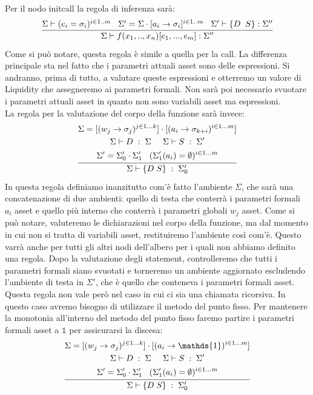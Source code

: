 \documentclass[12pt, a4paper]{report}
\begin{document}
Per il nodo initcall la regola di inferenza sarà:
\[
\infer{\Sigma \vdash f(x_1,..,x_n)[e_1,...,e_m] : \Sigma''}
{\Sigma \vdash (e_i = \sigma_i)^{i\in 1..m}\;\;\; \Sigma'=\Sigma \cdot [a_i \rightarrow \sigma_i]^{i\in 1..m}\;\;\; \Sigma' \vdash \{D\;\; S\} : \Sigma''}    
\]
Come si può notare, questa regola è simile a quella per la call. La differenza principale sta nel fatto che i parametri attuali asset sono delle espressioni. Si andranno, prima di tutto, a valutare queste espressioni e otterremo un valore di Liquidity che assegneremo ai parametri formali. Non sarà poi necessario svuotare i parametri attuali asset in quanto non sono variabili asset ma espressioni.\\
La regola per la valutazione del corpo della funzione sarà invece:
\[
\infer{\Sigma \vdash \{D\;S\} \;:\; \Sigma'_0 }
{\begin{gathered}
    \Sigma = [(w_j \rightarrow \sigma_{j})^{j \in 1 \dots k }] \cdot [(a_i \rightarrow \sigma_{k+i})^{i \in 1\dots m}]\\
    \Sigma \vdash D \;:\; \Sigma \;\;\;\;\; \Sigma \vdash S \;:\; \Sigma'\\
    \Sigma' = \Sigma'_0 \cdot \Sigma'_1 \;\;\; (\Sigma'_1(a_i) = \emptyset)^{i \in 1 \dots m}
\end{gathered}}
\]
In questa regola definiamo inanzitutto com'è fatto l'ambiente $\Sigma$, che sarà una concatenazione di due ambienti: quello di testa che conterrà i parametri formali $a_i$ asset e quello più interno che conterrà i parametri globali $w_j$ asset. Come si può notare, valuteremo le dichiarazioni nel corpo della funzione, ma dal momento in cui non si tratta di variabili asset, restituiremo l'ambiente così com'è. Questo varrà anche per tutti gli altri nodi dell'albero per i quali non abbiamo definito una regola. Dopo la valutazione degli statement, controlleremo che tutti i parametri formali siano svuotati e torneremo un ambiente aggiornato escludendo l'ambiente di testa in $\Sigma'$, che è quello che conteneva i parametri formali asset.\\
Questa regola non vale però nel caso in cui ci sia una chiamata ricorsiva. In questo caso avremo bisogno di utilizzare il metodo del punto fisso. Per mantenere la monotonia all'interno del metodo del punto fisso faremo partire i parametri formali asset a $\mathds{1}$ per assicurarsi la discesa:
\[
\infer{\Sigma \vdash \{D\;S\} \;:\; \Sigma'_0 }
{\begin{gathered}
    \Sigma = [(w_j \rightarrow \sigma_{j})^{j \in 1 \dots k }] \cdot [(a_i \rightarrow \mathds{1})^{i \in 1\dots m}]\\
    \Sigma \vdash D \;:\; \Sigma \;\;\;\;\; \Sigma \vdash S \;:\; \Sigma'\\
    \Sigma' = \Sigma'_0 \cdot \Sigma'_1 \;\;\; (\Sigma'_1(a_i) = \emptyset)^{i \in 1 \dots m}
\end{gathered}}
\]
\end{document}
